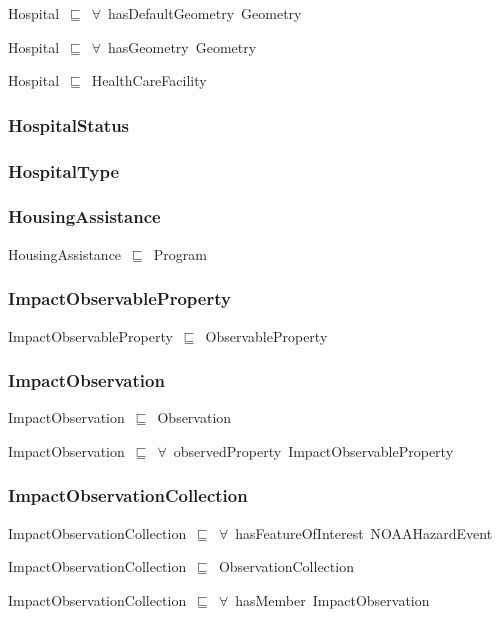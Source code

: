 \documentclass{article}
\begin{document}
Hospital~\ensuremath{\sqsubseteq}~\ensuremath{\forall}~hasDefaultGeometry~Geometry~

Hospital~\ensuremath{\sqsubseteq}~\ensuremath{\forall}~hasGeometry~Geometry~

Hospital~\ensuremath{\sqsubseteq}~HealthCareFacility~

\subsubsection*{HospitalStatus}

\subsubsection*{HospitalType}

\subsubsection*{HousingAssistance}

HousingAssistance~\ensuremath{\sqsubseteq}~Program~

\subsubsection*{ImpactObservableProperty}

ImpactObservableProperty~\ensuremath{\sqsubseteq}~ObservableProperty~

\subsubsection*{ImpactObservation}

ImpactObservation~\ensuremath{\sqsubseteq}~Observation~

ImpactObservation~\ensuremath{\sqsubseteq}~\ensuremath{\forall}~observedProperty~ImpactObservableProperty~

\subsubsection*{ImpactObservationCollection}

ImpactObservationCollection~\ensuremath{\sqsubseteq}~\ensuremath{\forall}~hasFeatureOfInterest~NOAAHazardEvent~

ImpactObservationCollection~\ensuremath{\sqsubseteq}~ObservationCollection~

ImpactObservationCollection~\ensuremath{\sqsubseteq}~\ensuremath{\forall}~hasMember~ImpactObservation~
\end{document}
